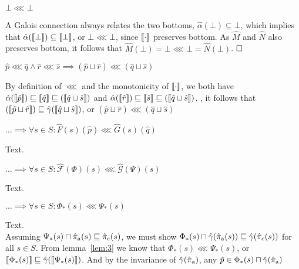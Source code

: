 \begin{lemma} \label{lem:bot-refine-bot}
$\bot \lll \bot$
\end{lemma}

A Galois connection always relates the two bottoms, $\hat \alpha(\bot) \subseteq \bot$, which implies that $\hat \alpha(\llbracket \bot \rrbracket) \subseteq \llbracket \bot \rrbracket$, or $\bot \lll \bot$, since $\llbracket \cdot \rrbracket$ preserves bottom. As $\hat M$ and $\hat N$ also preserves bottom, it follows that $\hat M(\bot) = \bot \lll \bot = \hat N(\bot)$. $\qedbox$

\begin{lemma} \label{lem:closed-join}
$\hat p \lll \hat q \wedge \hat r \lll \hat s \implies (\hat p \sqcup \hat r) \lll (\hat q \sqcup \hat s)$
\end{lemma}

By definition of $\lll$ and the monotonicity of $\llbracket \cdot \rrbracket$, we both have $\hat \alpha(\llbracket \hat p \rrbracket) \sqsubseteq \llbracket \hat q \rrbracket \sqsubseteq (\llbracket \hat q \sqcup \hat s \rrbracket)$ and $\hat \alpha(\llbracket \hat r \rrbracket) \sqsubseteq \llbracket \hat s \rrbracket \sqsubseteq (\llbracket \hat q \sqcup \hat s \rrbracket)$. , it follows that $(\llbracket \hat p \sqcup \hat r \rrbracket) \sqsubseteq \hat \gamma(\llbracket \hat q \sqcup \hat s \rrbracket)$, or $(\hat p \sqcup \hat r) \lll (\hat q \sqcup \hat s)$

\begin{lemma} \label{lem:1}
$\dots \implies \forall s \in S : \hat{F}(s)(\hat p) \lll \hat{G}(s)(\hat q)$
\end{lemma}

Text.

\begin{lemma} \label{lem:2}
$\dots \implies \forall s \in S : \hat{\mathcal{F}}(\Phi)(s) \lll \hat{\mathcal{G}}(\Psi)(s)$
\end{lemma}

Text.

\begin{lemma} \label{lem:3}
$\dots \implies \forall s \in S : \Phi_{*}(s) \lll \Psi_{*}(s)$
\end{lemma}

Text.
\\

Assuming $\Psi_{*}(s) \sqcap \operatorname{\hat{\pi}_{\textrm{a}}}(s) \sqsubseteq \operatorname{\hat{\pi}_{\textrm{c}}}(s)$, we must show $\Phi_{*}(s) \sqcap \hat{\gamma}(\operatorname{\hat{\pi}_{\textrm{a}}}(s)) \sqsubseteq \hat{\gamma}(\operatorname{\hat{\pi}_{\textrm{c}}}(s))$ for all $s \in S$. From lemma~\ref{lem:3} we know that $\Phi_{*}(s) \lll \Psi_{*}(s)$, or $\llbracket \Phi_{*}(s) \rrbracket \sqsubseteq \hat{\gamma}(\llbracket \Psi_{*}(s) \rrbracket)$. And by the invariance of $\hat{\gamma}(\operatorname{\hat{\pi}_{\textrm{a}}})$, any $\hat p \in \Phi_{*}(s) \sqcap \hat{\gamma}(\operatorname{\hat{\pi}_{\textrm{a}}})$ 

